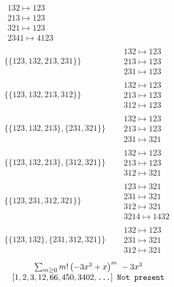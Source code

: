 \begin{tiny}
\begin{align}
\begin{matrix}
132 \mapsto 123\\213 \mapsto 123\\321 \mapsto 123\\2341 \mapsto 4123
\end{matrix}
\\
\{\{123, 132, 213, 231\}\}
\quad
&
\begin{matrix}
132 \mapsto 123\\213 \mapsto 123\\231 \mapsto 123
\end{matrix}
\\
\{\{123, 132, 213, 312\}\}
\quad
&
\begin{matrix}
132 \mapsto 123\\213 \mapsto 123\\312 \mapsto 123
\end{matrix}
\\
\{\{123, 132, 213\}, \{231, 321\}\}
\quad
&
\begin{matrix}
132 \mapsto 123\\213 \mapsto 123\\231 \mapsto 321
\end{matrix}
\\
\{\{123, 132, 213\}, \{312, 321\}\}
\quad
&
\begin{matrix}
132 \mapsto 123\\213 \mapsto 123\\312 \mapsto 321
\end{matrix}
\\
\{\{123, 231, 312, 321\}\}
\quad
&
\begin{matrix}
123 \mapsto 321\\231 \mapsto 321\\312 \mapsto 321\\3214 \mapsto 1432
\end{matrix}
\\
\{\{123, 132\}, \{231, 312, 321\}\}
\quad
&
\begin{matrix}
132 \mapsto 123\\231 \mapsto 321\\312 \mapsto 321
\end{matrix}
\end{align}
$$
\begin{matrix}
\sum_{m \geq 0} m! \left(
-3 x^{3} + x
\right)^m
\ 
-3 x^{3}
\\
\left[1, 2, 3, 12, 66, 450, 3402, \text{\texttt{...}}\right]
\ 
\texttt{Not present}
\end{matrix}
$$
\vspace{-1em}

\end{tiny}
